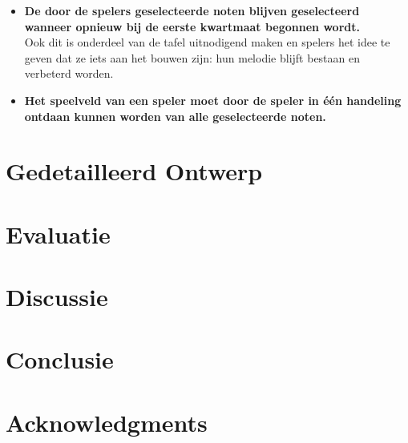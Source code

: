 \documentclass{acm}
\begin{document}
\begin{itemize}
	\item \textbf{De door de spelers geselecteerde noten blijven geselecteerd wanneer opnieuw bij de eerste kwartmaat begonnen wordt.} \\ Ook dit is onderdeel van de tafel uitnodigend maken en spelers het idee te geven dat ze iets aan het bouwen zijn: hun melodie blijft bestaan en verbeterd worden.
	\item \textbf{Het speelveld van een speler moet door de speler in \'e\'en handeling ontdaan kunnen worden van alle geselecteerde noten.}
\end{itemize}


\section{Gedetailleerd Ontwerp}
\label{sec_detail}

\section{Evaluatie}
\label{sec_evaluatie}

\section{Discussie}
\label{sec_discussie}

\section{Conclusie}
\label{sec_conclusie}

\section{Acknowledgments}
\end{document}
